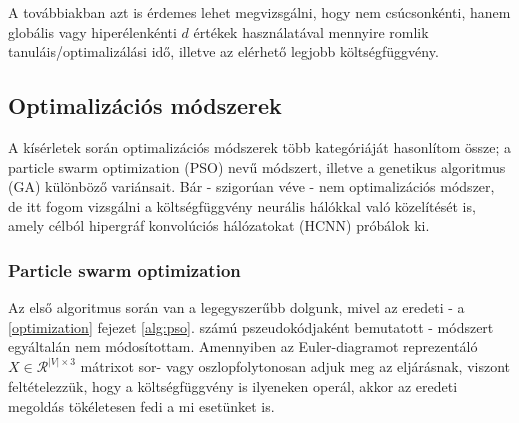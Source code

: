 A továbbiakban azt is érdemes lehet megvizsgálni, hogy nem csúcsonkénti, hanem globális vagy hiperélenkénti $d$ értékek használatával mennyire romlik tanuláis/optimalizálási idő, illetve az elérhető legjobb költségfüggvény.



\subsection{Optimalizációs módszerek}

A kísérletek során optimalizációs módszerek több kategóriáját hasonlítom össze; a particle swarm optimization (PSO) nevű módszert, illetve a genetikus algoritmus (GA) különböző variánsait. Bár - szigorúan véve - nem optimalizációs módszer, de itt fogom vizsgálni a költségfüggvény neurális hálókkal való közelítését is, amely célból hipergráf konvolúciós hálózatokat (HCNN) próbálok ki.

\subsubsection{Particle swarm optimization}
Az első algoritmus során van a legegyszerűbb dolgunk, mivel az eredeti - a \ref{optimization} fejezet \ref{alg:pso}. számú pszeudokódjaként bemutatott - módszert egyáltalán nem módosítottam. Amennyiben az Euler-diagramot reprezentáló $X \in \mathcal{R}^{|V| \times 3}$ mátrixot sor- vagy oszlopfolytonosan adjuk meg az eljárásnak, viszont feltételezzük, hogy a költségfüggvény is ilyeneken operál, akkor az eredeti megoldás tökéletesen fedi a mi esetünket is.

